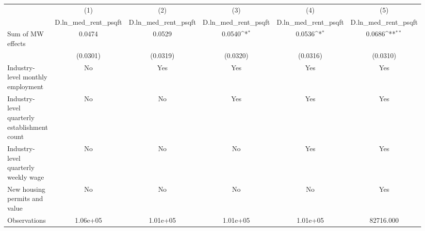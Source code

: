 {
\def\sym#1{\ifmmode^{#1}\else\(^{#1}\)\fi}
\begin{tabular}{l*{5}{c}}
\hline\hline
          &\multicolumn{1}{c}{(1)}&\multicolumn{1}{c}{(2)}&\multicolumn{1}{c}{(3)}&\multicolumn{1}{c}{(4)}&\multicolumn{1}{c}{(5)}\\
          &\multicolumn{1}{c}{D.ln\_med\_rent\_psqft}&\multicolumn{1}{c}{D.ln\_med\_rent\_psqft}&\multicolumn{1}{c}{D.ln\_med\_rent\_psqft}&\multicolumn{1}{c}{D.ln\_med\_rent\_psqft}&\multicolumn{1}{c}{D.ln\_med\_rent\_psqft}\\
\hline
Sum of MW effects&   0.0474         &   0.0529         &   0.0540\sym{*}  &   0.0536\sym{*}  &   0.0686\sym{**} \\
          & (0.0301)         & (0.0319)         & (0.0320)         & (0.0316)         & (0.0310)         \\
\hline
Industry-level monthly employment&       No         &      Yes         &      Yes         &      Yes         &      Yes         \\
Industry-level quarterly establishment count&       No         &       No         &      Yes         &      Yes         &      Yes         \\
Industry-level quarterly weekly wage&       No         &       No         &       No         &      Yes         &      Yes         \\
New housing permits and value&       No         &       No         &       No         &       No         &      Yes         \\
Observations& 1.06e+05         & 1.01e+05         & 1.01e+05         & 1.01e+05         &82716.000         \\
\hline\hline
\end{tabular}
}
